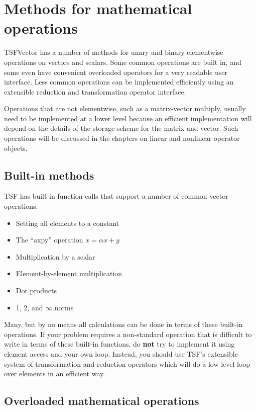 \section{Methods for mathematical operations}

TSFVector has a number of methods for
unary and binary elementwise operations on vectors
and scalars. Some common operations are built in, and some even 
have convenient overloaded operators for
a very readable user interface. Less common operations can be implemented efficiently
using an extensible reduction and transformation operator interface. 

Operations that are not elementwise, such as a matrix-vector multiply, usually
need to be implemented at a lower level because an efficient implementation will depend
on the details of the storage scheme for the matrix and vector. Such operations
will be discussed in the chapters on linear and nonlinear operator objects.

\subsection{Built-in methods}

TSF has built-in function calls that support a number of common vector operations. 

\begin{itemize}
\item Setting all elements to a constant
\item The ``axpy'' operation $x = \alpha x + y$
\item Multiplication by a scalar
\item Element-by-element multiplication
\item Dot products
\item 1, 2, and $\infty$ norms
\end{itemize}

Many, but by no means all calculations can be done in terms of these built-in operations.
If your problem requires a non-standard operation that is difficult to write in terms
of these built-in functions, do {\bf not} try to implement it using element access and
your own loop. Instead, you should use TSF's extensible system of transformation
and reduction operators which will do a low-level loop over elements in 
an efficient way. 

\subsection{Overloaded mathematical operations}

